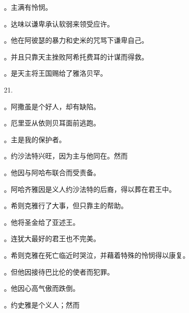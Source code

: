 。主满有怜悯。\par

。达味以谦卑承认软弱来领受应许。\par

。他在阿彼瑟的暴力和史米的咒骂下谦卑自己。\par

。并且只靠天主挫败阿希托费耳的计谋而得救。\par

。是天主将王国赐给了雅洛贝罕。\par

21.\par

。阿撒虽是个好人，却有缺陷。\par

。厄里亚从依则贝耳面前逃跑。\par

。主是我的保护者。\par

。约沙法特兴旺，因为主与他同在。然而\par

。他因与阿哈布联合而受责备。\par

。阿哈齐雅因是义人约沙法特的后裔，得以葬在君王中。\par

。希则克雅行了大事，但只靠主的帮助。\par

。他将圣金给了亚述王。\par

。连犹大最好的君王也不完美。\par

。希则克雅在死亡临近时哭泣，并藉着特殊的怜悯得以康复。\par

。但他因接待巴比伦的使者而犯罪。\par

。他因心高气傲而跌倒。\par

。约史雅是个义人；然而\par

